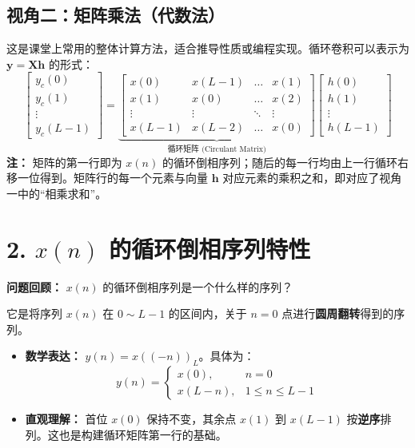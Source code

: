 \documentclass[12pt, a4paper]{article}
\begin{document}
\begin{tcolorbox}[title=回答要点, breakable]
		\subsection*{视角二：矩阵乘法（代数法）}
		这是课堂上常用的整体计算方法，适合推导性质或编程实现。循环卷积可以表示为 $\mathbf{y} = \mathbf{X}\mathbf{h}$ 的形式：
		\[
		\begin{bmatrix} y_c(0) \\ y_c(1) \\ \vdots \\ y_c(L-1) \end{bmatrix} =
		\underbrace{
			\begin{bmatrix}
				x(0) & x(L-1) & \dots & x(1) \\
				x(1) & x(0) & \dots & x(2) \\
				\vdots & \vdots & \ddots & \vdots \\
				x(L-1) & x(L-2) & \dots & x(0)
			\end{bmatrix}
		}_{\text{循环矩阵 (Circulant Matrix)}}
		\begin{bmatrix} h(0) \\ h(1) \\ \vdots \\ h(L-1) \end{bmatrix}
		\]
		\textbf{注：} 矩阵的第一行即为 $x(n)$ 的循环倒相序列；随后的每一行均由上一行循环右移一位得到。矩阵行的每一个元素与向量 $\mathbf{h}$ 对应元素的乘积之和，即对应了视角一中的“相乘求和”。
	\end{tcolorbox}

	\section*{2. $x(n)$ 的循环倒相序列特性}

	\textbf{问题回顾：} $x(n)$ 的循环倒相序列是一个什么样的序列？

	\begin{tcolorbox}[title=回答要点, breakable]
		它是将序列 $x(n)$ 在 $0 \sim L-1$ 的区间内，关于 $n=0$ 点进行\textbf{圆周翻转}得到的序列。
		\begin{itemize}
			\item \textbf{数学表达：} $y(n) = x((-n))_L$。具体为：
			\[
			y(n) = \begin{cases}
				x(0), & n=0 \\
				x(L-n), & 1 \le n \le L-1
			\end{cases}
			\]
			\item \textbf{直观理解：} 首位 $x(0)$ 保持不变，其余点 $x(1)$ 到 $x(L-1)$ 按\textbf{逆序}排列。这也是构建循环矩阵第一行的基础。
		\end{itemize}
	\end{tcolorbox}
\end{document}
